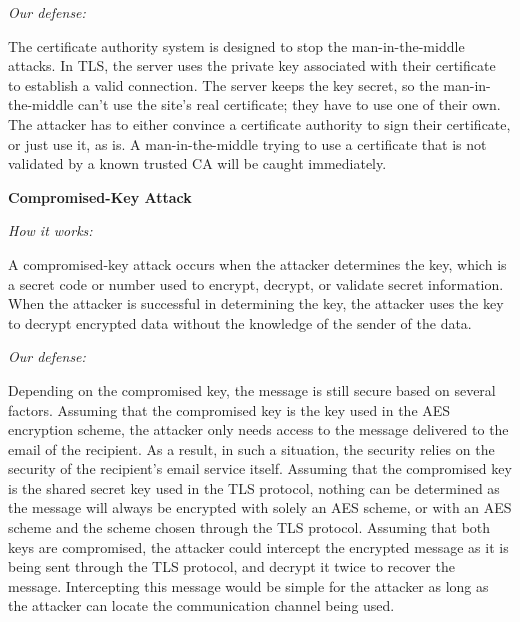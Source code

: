\documentclass[a4paper,twoside,10pt]{report}
\begin{document}
\vspace{2.5mm}
\noindent
\textit{Our defense: }

The certificate authority system is designed to stop the man-in-the-middle attacks. In TLS, the server uses the private key associated with their certificate to establish a valid connection. The server keeps the key secret, so the man-in-the-middle can't use the site's real certificate; they have to use one of their own. The attacker has to either convince a certificate authority to sign their certificate, or just use it, as is. A man-in-the-middle trying to use a certificate that is not validated by a known trusted CA will be caught immediately.

\vspace{2.5mm}
\noindent
{\large\textbf{Compromised-Key Attack}}

\vspace{1mm}
\noindent
\textit{How it works: }

A compromised-key attack occurs when the attacker determines the key, which is a secret code or number used to encrypt, decrypt, or validate secret information. When the attacker is successful in determining the key, the attacker uses the key to decrypt encrypted data without the knowledge of the sender of the data. 

\vspace{2.5mm}
\noindent
\textit{Our defense: }

Depending on the compromised key, the message is still secure based on several factors. Assuming that the compromised key is the key used in the AES encryption scheme, the attacker only needs access to the message delivered to the email of the recipient. As a result, in such a situation, the security relies on the security of the recipient's email service itself. Assuming that the compromised key is the shared secret key used in the TLS protocol, nothing can be determined as the message will always be encrypted with solely an AES scheme, or with an AES scheme and the scheme chosen through the TLS protocol. Assuming that both keys are compromised, the attacker could intercept the encrypted message as it is being sent through the TLS protocol, and decrypt it twice to recover the message. Intercepting this message would be simple for the attacker as long as the attacker can locate the communication channel being used.


\end{document}
